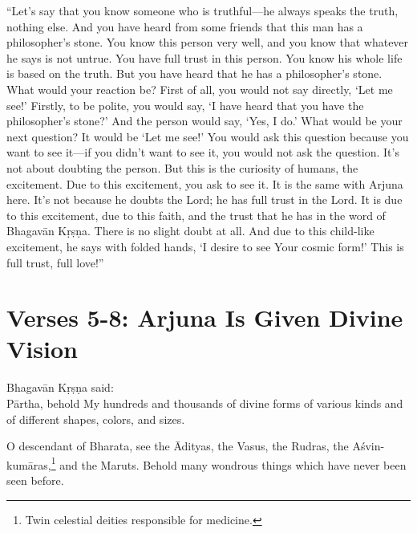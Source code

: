 \enquote{Let’s say that you know someone who is truthful---he always speaks the truth, nothing else. And you have heard from some friends that this man has a philosopher’s stone. You know this person very well, and you know that whatever he says is not untrue. You have full trust in this person. You know his whole life is based on the truth. But you have heard that he has a philosopher’s stone. What would your reaction be? First of all, you would not say directly, \enquote{Let me see!} Firstly, to be polite, you would say, \enquote{I have heard that you have the philosopher’s stone?} And the person would say, \enquote{Yes, I do.} What would be your next question? It would be \enquote{Let me see!} You would ask this question because you want to see it---if you didn’t want to see it, you would not ask the question. It’s not about doubting the person. But this is the curiosity of humans, the excitement. Due to this excitement, you ask to see it. It is the same with Arjuna here. It’s not because he doubts the Lord; he has full trust in the Lord. It is due to this excitement, due to this faith, and the trust that he has in the word of Bhagavān Kṛṣṇa. There is no slight doubt at all. And due to this child-like excitement, he says with folded hands, \enquote{I desire to see Your cosmic form!} This is full trust, full love!}

\section{Verses 5-8: Arjuna Is Given Divine Vision}\label{sec-verses-5-8-arjuna-is-given-divine-vision}

{\hspace*{1em}Bhagavān Kṛṣṇa said: \\
Pārtha, behold My hundreds and thousands of divine forms of various kinds and of different shapes, colors, and sizes.}

{O descendant of Bharata, see the Ādityas, the Vasus, the Rudras, the Aśvin-kumāras,\footnote{Twin celestial deities responsible for medicine.} and the Maruts. Behold many wondrous things which have never been seen before.}

